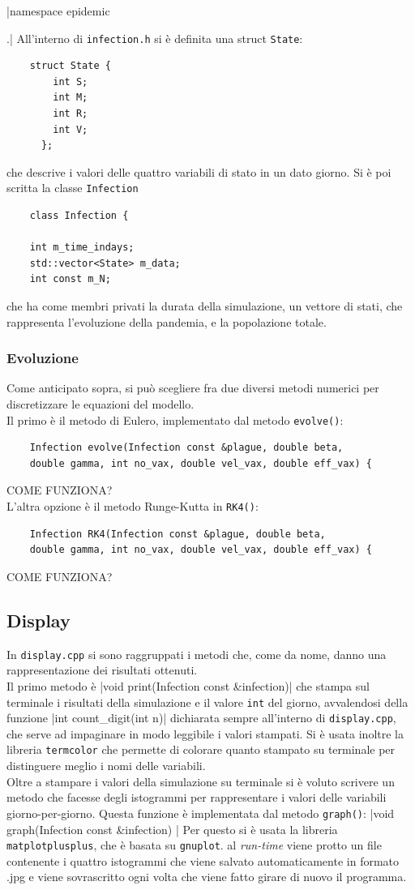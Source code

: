 \documentclass{article}
\begin{document}
|namespace epidemic{.|
All'interno di \verb|infection.h| si è definita una struct 
\verb|State|: 
\begin{verbatim}
    struct State {
        int S; 
        int M; 
        int R; 
        int V; 
      };
\end{verbatim}
che descrive i valori delle quattro variabili di stato in un dato giorno.
Si è poi scritta la classe \verb|Infection|
\begin{verbatim}
    class Infection {

    int m_time_indays; 
    std::vector<State> m_data; 
    int const m_N; 
\end{verbatim}    
che ha come membri privati la durata della simulazione, un vettore di 
stati, che rappresenta l'evoluzione della pandemia, e la popolazione 
totale.
\subsubsection{Evoluzione}
Come anticipato sopra, si può scegliere fra due diversi metodi 
numerici per discretizzare le equazioni del modello.\\
Il primo è il metodo di Eulero, implementato dal metodo 
\verb|evolve()|:
\begin{verbatim}
    Infection evolve(Infection const &plague, double beta, 
    double gamma, int no_vax, double vel_vax, double eff_vax) {
\end{verbatim}
COME FUNZIONA?\\
L'altra opzione è il metodo Runge-Kutta in \verb|RK4()|:
\begin{verbatim}
    Infection RK4(Infection const &plague, double beta, 
    double gamma, int no_vax, double vel_vax, double eff_vax) {
\end{verbatim}
COME FUNZIONA?
\subsection{Display}
In \verb|display.cpp| si sono raggruppati i metodi che, come da 
nome, danno una rappresentazione dei risultati ottenuti.\\
Il primo metodo è 
|void print(Infection const &infection){|
che stampa sul terminale i risultati della simulazione e il valore 
\verb|int| del giorno, avvalendosi della funzione 
|int count_digit(int n){|
dichiarata sempre all'interno di \verb|display.cpp|, che serve ad 
impaginare in modo leggibile i valori stampati.
Si è usata inoltre la libreria \verb|termcolor| che permette di 
colorare quanto stampato su terminale per distinguere meglio
i nomi delle variabili. \\
Oltre a stampare i valori della simulazione su terminale si è voluto
scrivere un metodo che facesse degli istogrammi per rappresentare i
valori delle variabili giorno-per-giorno.
Questa funzione è implementata dal metodo \verb|graph()|:
|void graph(Infection const &infection) {|
Per questo si è usata la libreria \verb|matplotplusplus|, che è 
basata su \verb|gnuplot|. al \textit{run-time} viene protto un 
file contenente i quattro istogrammi che viene salvato 
automaticamente in formato .jpg e viene sovrascritto ogni volta che
viene fatto girare di nuovo il programma.
}}}}
\end{document}
